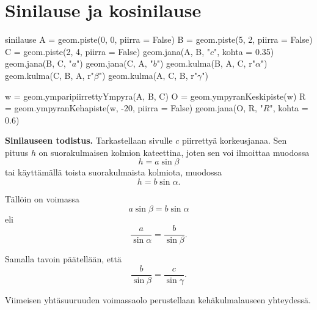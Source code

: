 \section*{Sinilause ja kosinilause}

\begin{luoKuva}{sinilause}
A = geom.piste(0, 0, piirra = False)
B = geom.piste(5, 2, piirra = False)
C = geom.piste(2, 4, piirra = False)
geom.jana(A, B, "$c$", kohta = 0.35)
geom.jana(B, C, "$a$")
geom.jana(C, A, "$b$")
geom.kulma(B, A, C, r"$\alpha$")
geom.kulma(C, B, A, r"$\beta$")
geom.kulma(A, C, B, r"$\gamma$")

w = geom.ymparipiirrettyYmpyra(A, B, C)
O = geom.ympyranKeskipiste(w)
R = geom.ympyranKehapiste(w, -20, piirra = False)
geom.jana(O, R, "$R$", kohta = 0.6)
\end{luoKuva}


\textbf{Sinilauseen todistus.} Tarkastellaan sivulle $c$ piirrettyä korkeusjanaa.
Sen pituus $h$ on suorakulmaisen kolmion kateettina, joten sen voi ilmoittaa muodossa
\[
h = a \sin \beta
\]
tai käyttämällä toista suorakulmaista kolmiota, muodossa
\[
h = b \sin \alpha .
\]

Tällöin on voimassa
\[
a \sin \beta = b \sin \alpha
\]
eli
\[
\frac{a}{\sin \alpha} = \frac{b}{\sin \beta}.
\]

Samalla tavoin päätellään, että
\[
\frac{b}{\sin \beta} = \frac{c}{\sin \gamma}.
\]

Viimeisen yhtäsuuruuden voimassaolo perustellaan kehäkulmalauseen yhteydessä.

